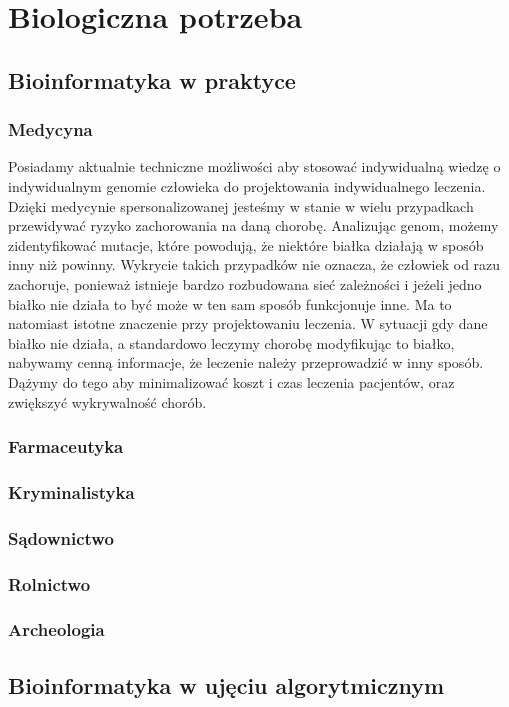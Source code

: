 \chapter{Biologiczna potrzeba}
\label{section:biologiny_wstep}

\section{Bioinformatyka w praktyce}
\subsection{Medycyna}
Posiadamy aktualnie techniczne możliwości aby stosować indywidualną wiedzę o indywidualnym genomie człowieka do projektowania indywidualnego leczenia. Dzięki medycynie spersonalizowanej jesteśmy w stanie w wielu przypadkach przewidywać ryzyko zachorowania na daną chorobę. Analizując genom, możemy zidentyfikować mutacje, które powodują, że niektóre białka działają w sposób inny niż powinny. Wykrycie takich przypadków nie oznacza, że człowiek od razu zachoruje, ponieważ istnieje bardzo rozbudowana sieć zależności i jeżeli jedno białko nie działa to być może w ten sam sposób funkcjonuje inne. Ma to natomiast istotne znaczenie przy projektowaniu leczenia. W sytuacji gdy dane białko nie działa, a standardowo leczymy chorobę modyfikując to białko, nabywamy cenną informacje, że leczenie należy przeprowadzić w inny sposób. Dążymy do tego aby minimalizować koszt i czas leczenia pacjentów, oraz zwiększyć wykrywalność chorób.

\subsection{Farmaceutyka}
\subsection{Kryminalistyka}
\subsection{Sądownictwo}
\subsection{Rolnictwo}
\subsection{Archeologia}

\section{Bioinformatyka w ujęciu algorytmicznym}
